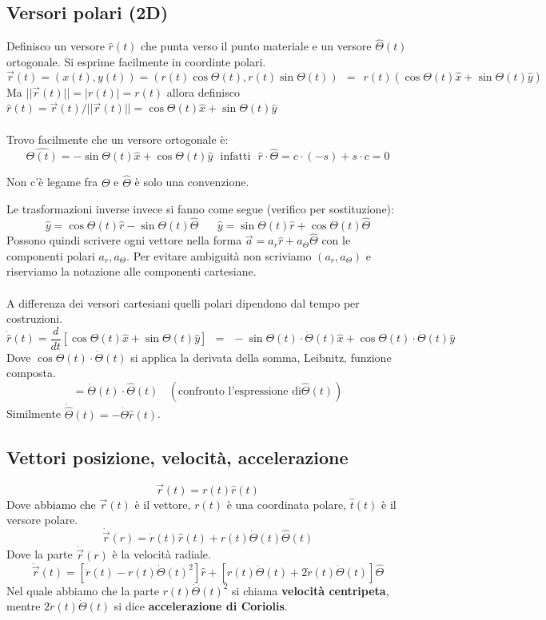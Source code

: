 \subsection{Versori polari (2D)}
Definisco un versore $\hat{r}(t)$ che punta verso il punto materiale e un versore $\hat{\Theta}(t)$ ortogonale.
Si esprime facilmente in coordinte polari.
$$\vec{r}(t) = (x(t), y(t)) = (r(t)\cos \Theta(t), r(t)\sin\Theta(t)) \:\: = \:\: r(t)(\cos\Theta(t)\hat{x} + \sin\Theta(t)\hat{y})$$
Ma $||\vec{r}(t)|| = |r(t)| = r(t)$ allora definisco $\hat{r}(t) = \vec{r}(t)/ ||\vec{r}(t)|| = \cos \Theta(t)\hat{x} + \sin\Theta(t)\hat{y}$\\\\
Trovo facilmente che un versore ortogonale è:
$$\hat{\Theta(t)} = -\sin\Theta(t)\hat{x} + \cos\Theta(t)\hat{y} \:\:\:\text{infatti} \:\:\: \hat{r}\cdot \hat{\Theta} = c \cdot (-s) + s \cdot c = 0$$
\begin{note}
    Non c'è legame fra $\Theta$ e $\hat{\Theta}$ è solo una convenzione.
\end{note}
\hspace{-15pt}Le trasformazioni inverse invece si fanno come segue (verifico per sostituzione):
$$\hat{y} = \cos\Theta(t)\hat{r} - \sin\Theta(t)\hat{\Theta} \hspace{20pt} \hat{y} = \sin\Theta(t)\hat{r} + \cos\Theta(t)\hat{\Theta}$$
Possono quindi scrivere ogni vettore nella forma $\vec{a} = a_r\hat{r} + a_{\Theta}\hat{\Theta}$ con le componenti polari $a_r, a_{\Theta}$.
Per evitare ambiguità non scriviamo $(a_r, a_{\Theta})$ e riserviamo la notazione alle componenti cartesiane.\\\\
A differenza dei versori cartesiani quelli polari dipendono dal tempo per costruzioni.
$$\dot{\hat{r}}(t) = \frac{d}{dt}[\cos\Theta(t) \hat{x} + \sin\Theta(t)\hat{y}] \:\: = \:\: -\sin\Theta(t) \cdot \dot{\Theta}(t)\hat{x} + \cos\Theta(t) \cdot \dot{\Theta}(t)\hat{y}$$
Dove $\cos\Theta(t) \cdot \dot{\Theta}(t)$ si applica la derivata della somma, Leibnitz, funzione composta.
$$= \dot{\Theta}(t)\cdot \hat{\Theta}(t) \:\:\:\:(\text{confronto l'espressione di} \hat{\Theta}(t))$$
Similmente $\dot{\hat{\Theta}}(t)= - \dot{\Theta}\hat{r}(t)$.


\subsection*{Vettori posizione, velocità, accelerazione}
$$\vec{r}(t) = r(t)\hat{r}(t)$$
Dove abbiamo che $\vec{r}(t)$ è il vettore, $r(t)$ è una coordinata polare, $\hat{t}(t)$ è il versore polare.
$$\dot{\vec{r}}(r) = \dot{r}(t)\hat{r}(t) + r(t)\dot{\Theta}(t)\hat{\Theta}(t)$$
Dove la parte $\dot{\vec{r}}(r)$ è la velocità radiale.
$$\ddot{\vec{r}}(t) = [\ddot{r}(t) - r(t)\dot{\Theta}(t)^2] \hat{r} + [r(t) \ddot{\Theta}(t) + 2\dot{r}(t)\dot{\Theta}(t)]\hat{\Theta}$$
Nel quale abbiamo che la parte $r(t)\dot{\Theta}(t)^2$ si chiama \textbf{velocità centripeta}, mentre $2\dot{r}(t)\dot{\Theta}(t)$ si dice \textbf{accelerazione di Coriolis}.

